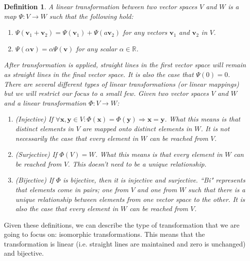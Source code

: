 \documentclass[a4paper,12pt]{book}
\newcommand{\vectr}[1]{\textbf{#1}}
\newcommand{\real}{\mathbb{R}}
\newcommand{\vecspace}[1]{#1}
\newtheorem{definition}{Definition}[section]
\begin{document}
	\begin{definition}
		\normalfont A linear transformation between two vector spaces $ \vecspace{V} $ and $ \vecspace{W} $ is a map $ \Psi: \vecspace{V} \rightarrow \vecspace{W} $ such that the following hold:
		\begin{enumerate}
			\item $ \Psi(\vectr{v}_1 + \vectr{v}_2) = \Psi(\vectr{v}_1) + \Psi(a\vectr{v}_2)$ for any vectors $ \vectr{v}_1 $ and $ \vectr{v}_2 $ in $ \vecspace{V} $.
			\item $ \Psi(\alpha \vectr{v}) = \alpha \Psi(\vectr{v})$ for any scalar $ \alpha \in \real $.  
		\end{enumerate}
		After transformation is applied, straight lines in the first vector space will remain as straight lines in the final vector space. It is also the case that $ \Psi(0) = 0 $. There are several different types of linear transformations (or linear mappings) but we will restrict our focus to a small few. Given two vector spaces $ \vecspace{V} $ and $ \vecspace{W} $ and a linear transformation $ \Phi: \vecspace{V} \rightarrow \vecspace{W} $:
		\begin{enumerate}
			\item (Injective) If $ \forall \vectr{x}, \vectr{y} \in \vecspace{V}: \Phi(\vectr{x}) = \Phi(\vectr{y}) \Longrightarrow \vectr{x} = \vectr{y}$. What this means is that distinct elements in $ \vecspace{V} $ are mapped onto distinct elements in $ \vecspace{W} $. It is not necessarily the case that every element in $ \vecspace{W} $ can be reached from $ \vecspace{V} $. 
			\item (Surjective) If $ \Phi(\vecspace{V}) = \vecspace{W}$. What this means is that every element in $ \vecspace{W} $ can be reached from $ \vecspace{V} $. This doesn't need to be a unique relationship. 
			\item (Bijective) If $ \Phi $ is bijective, then it is injective and surjective. ``Bi" represents that elements come in pairs; one from $ \vecspace{V} $ and one from $ \vecspace{W} $ such that there is a unique relationship between elements from one vector space to the other. It is also the case that every element in $ \vecspace{W} $ can be reached from $ \vecspace{V} $.
		\end{enumerate}
	\end{definition}
	Given these definitions, we can describe the type of transformation that we are going to focus on: isomorphic transformations. This means that the transformation is linear (i.e. straight lines are maintained and zero is unchanged) and bijective. 
\end{document}
